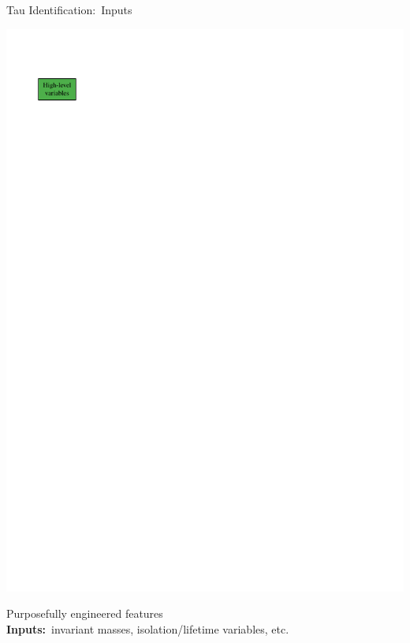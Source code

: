 \documentclass[11pt, xcolor={dvipsnames}, aspectratio=169, notes]{beamer}
\begin{document}
\begin{frame}{Tau Identification:\ Inputs}

  \begin{minipage}[c][2.2cm][c]{0.25\textwidth}
    \centering

    \includegraphics[scale=1]{tauid/high_level_icon}
  \end{minipage}%
  \begin{minipage}[c][2.2cm][c]{0.75\textwidth}
    Purposefully engineered features\\[0.5\baselineskip]
    \textbf{Inputs:}\ invariant masses, isolation/lifetime variables, etc.
  \end{minipage}%

  \pause

  \begin{minipage}[c][2.2cm][c]{0.25\textwidth}
    \centering


\end{minipage}
\end{frame}
\end{document}
